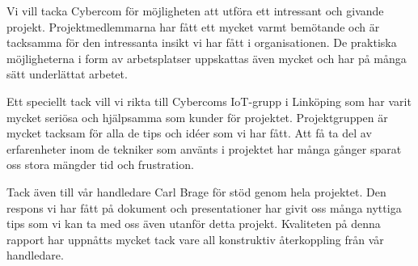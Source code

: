 
Vi vill tacka Cybercom för möjligheten att utföra ett intressant och givande projekt. Projektmedlemmarna har fått ett mycket varmt bemötande och är tacksamma för den intressanta insikt vi har fått i organisationen. De praktiska möjligheterna i form av arbetsplatser uppskattas även mycket och har på många sätt underlättat arbetet.

Ett speciellt tack vill vi rikta till Cybercoms IoT-grupp i Linköping som har varit mycket seriösa och hjälpsamma som kunder för projektet. Projektgruppen är mycket tacksam för alla de tips och idéer som vi har fått. Att få ta del av erfarenheter inom de tekniker som använts i projektet har många gånger sparat oss stora mängder tid och frustration.

Tack även till vår handledare Carl Brage för stöd genom hela projektet. Den respons vi har fått på dokument och presentationer har givit oss många nyttiga tips som vi kan ta med oss även utanför detta projekt. Kvaliteten på denna rapport har uppnåtts mycket tack vare all konstruktiv återkoppling från vår handledare.
